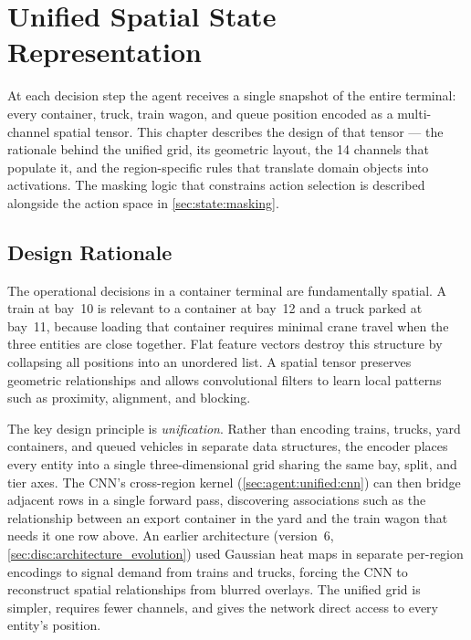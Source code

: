 \chapter{Unified Spatial State Representation}
\label{ch:state}

At each decision step the agent receives a single snapshot of the entire terminal: every container, truck, train wagon, and queue position encoded as a multi-channel spatial tensor. This chapter describes the design of that tensor --- the rationale behind the unified grid, its geometric layout, the 14 channels that populate it, and the region-specific rules that translate domain objects into activations. The masking logic that constrains action selection is described alongside the action space in \cref{sec:state:masking}.

\section{Design Rationale}
\label{sec:state:rationale}

The operational decisions in a container terminal are fundamentally spatial. A train at bay~10 is relevant to a container at bay~12 and a truck parked at bay~11, because loading that container requires minimal crane travel when the three entities are close together. Flat feature vectors destroy this structure by collapsing all positions into an unordered list. A spatial tensor preserves geometric relationships and allows convolutional filters to learn local patterns such as proximity, alignment, and blocking.

The key design principle is \emph{unification}. Rather than encoding trains, trucks, yard containers, and queued vehicles in separate data structures, the encoder places every entity into a single three-dimensional grid sharing the same bay, split, and tier axes. The CNN's cross-region kernel (\cref{sec:agent:unified:cnn}) can then bridge adjacent rows in a single forward pass, discovering associations such as the relationship between an export container in the yard and the train wagon that needs it one row above. An earlier architecture (version~6, \cref{sec:disc:architecture_evolution}) used Gaussian heat maps in separate per-region encodings to signal demand from trains and trucks, forcing the CNN to reconstruct spatial relationships from blurred overlays. The unified grid is simpler, requires fewer channels, and gives the network direct access to every entity's position.

